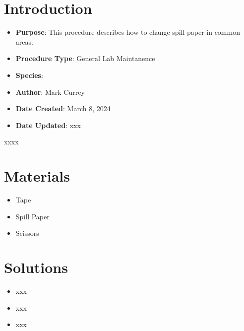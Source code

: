 \documentclass[
  letterpaper,
  DIV=11,
  numbers=noendperiod]{scrreprt}
\providecommand{\tightlist}{%
  \setlength{\itemsep}{0pt}\setlength{\parskip}{0pt}}\usepackage{longtable,booktabs,array}
\begin{document}
\hypertarget{introduction-6}{%
\section{Introduction}\label{introduction-6}}

\begin{itemize}
\item
  \textbf{Purpose}: This procedure describes how to change spill paper
  in common areas.
\item
  \textbf{Procedure Type}: General Lab Maintanence
\item
  \textbf{Species}:
\item
  \textbf{Author}: Mark Currey
\item
  \textbf{Date Created}: March 8, 2024
\item
  \textbf{Date Updated}: xxx
\end{itemize}

\begin{tcolorbox}[enhanced jigsaw, rightrule=.15mm, title=\textcolor{quarto-callout-warning-color}{\faExclamationTriangle}\hspace{0.5em}{NOTES}, titlerule=0mm, opacitybacktitle=0.6, toprule=.15mm, bottomrule=.15mm, opacityback=0, left=2mm, colframe=quarto-callout-warning-color-frame, breakable, coltitle=black, colback=white, colbacktitle=quarto-callout-warning-color!10!white, bottomtitle=1mm, leftrule=.75mm, toptitle=1mm, arc=.35mm]

xxxx

\end{tcolorbox}

\hypertarget{materials-6}{%
\section{Materials}\label{materials-6}}

\begin{itemize}
\tightlist
\item
  Tape
\item
  Spill Paper
\item
  Scissors
\end{itemize}

\hypertarget{solutions-6}{%
\section{Solutions}\label{solutions-6}}

\begin{itemize}
\tightlist
\item
  xxx
\item
  xxx
\item
  xxx
\end{itemize}
\end{document}

